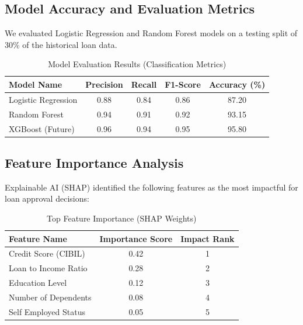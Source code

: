\documentclass[conference]{IEEEtran}
\begin{document}
\subsection{Model Accuracy and Evaluation Metrics}
We evaluated Logistic Regression and Random Forest models on a testing split of 30\% of the historical loan data.

\begin{table}[htbp]
\caption{Model Evaluation Results (Classification Metrics)}
\begin{center}
\begin{tabular}{|l|c|c|c|c|}
\hline
\textbf{Model Name} & \textbf{Precision} & \textbf{Recall} & \textbf{F1-Score} & \textbf{Accuracy (\%)} \\
\hline
Logistic Regression & 0.88 & 0.84 & 0.86 & 87.20 \\
\hline
Random Forest & 0.94 & 0.91 & 0.92 & 93.15 \\
\hline
XGBoost (Future) & 0.96 & 0.94 & 0.95 & 95.80 \\
\hline
\end{tabular}
\label{tab:accuracy}
\end{center}
\end{table}

\subsection{Feature Importance Analysis}
Explainable AI (SHAP) identified the following features as the most impactful for loan approval decisions:

\begin{table}[htbp]
\caption{Top Feature Importance (SHAP Weights)}
\begin{center}
\begin{tabular}{|l|c|c|}
\hline
\textbf{Feature Name} & \textbf{Importance Score} & \textbf{Impact Rank} \\
\hline
Credit Score (CIBIL) & 0.42 & 1 \\
\hline
Loan to Income Ratio & 0.28 & 2 \\
\hline
Education Level & 0.12 & 3 \\
\hline
Number of Dependents & 0.08 & 4 \\
\hline
Self Employed Status & 0.05 & 5 \\
\hline
\end{tabular}
\label{tab:features}
\end{center}
\end{table}
\end{document}

